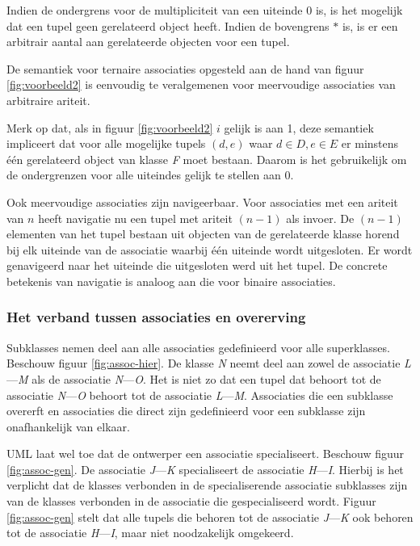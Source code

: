 Indien de ondergrens voor de multipliciteit van een uiteinde $0$ is, is het mogelijk dat een tupel geen gerelateerd object heeft. Indien de bovengrens $*$ is, is er een arbitrair aantal aan gerelateerde objecten voor een tupel.

De semantiek voor ternaire associaties opgesteld aan de hand van figuur \ref{fig:voorbeeld2} is eenvoudig te veralgemenen voor meervoudige associaties van arbitraire ariteit.

Merk op dat, als in figuur \ref{fig:voorbeeld2} $i$ gelijk is aan 1, deze semantiek impliceert dat voor alle mogelijke tupels $(d,e)$ waar $d \in D, e \in E$ er minstens \'e\'en gerelateerd object van klasse \textit{F} moet bestaan. Daarom is het gebruikelijk om de ondergrenzen voor alle uiteindes gelijk te stellen aan 0.

Ook meervoudige associaties zijn navigeerbaar. Voor associaties met een ariteit van $n$ heeft navigatie nu een tupel met ariteit $(n-1)$ als invoer. De $(n-1)$ elementen van het tupel bestaan uit objecten van de gerelateerde klasse horend bij elk uiteinde van de associatie waarbij \'e\'en uiteinde wordt uitgesloten. Er wordt genavigeerd naar het uiteinde die uitgesloten werd uit het tupel. De concrete betekenis van navigatie is analoog aan die voor binaire associaties.

\subsubsection{Het verband tussen associaties en overerving}

Subklasses nemen deel aan alle associaties gedefinieerd voor alle superklasses. Beschouw figuur \ref{fig:assoc-hier}. De klasse \textit{N} neemt deel aan zowel de associatie \textit{L}---\textit{M} als de associatie \textit{N}---\textit{O}. Het is niet zo dat een tupel dat behoort tot de associatie \textit{N}---\textit{O} behoort tot de associatie \textit{L}---\textit{M}. Associaties die een subklasse overerft en associaties die direct zijn gedefinieerd voor een subklasse zijn onafhankelijk van elkaar.

UML laat wel toe dat de ontwerper een associatie specialiseert\cite{RumbaughJames2005Tuml}. Beschouw figuur \ref{fig:assoc-gen}. De associatie \textit{J}---\textit{K} specialiseert de associatie \textit{H}---\textit{I}. Hierbij is het verplicht dat de klasses verbonden in de specialiserende associatie subklasses zijn van de klasses verbonden in de associatie die gespecialiseerd wordt. Figuur \ref{fig:assoc-gen} stelt dat alle tupels die behoren tot de associatie \textit{J}---\textit{K} ook behoren tot de associatie \textit{H}---\textit{I}, maar niet noodzakelijk omgekeerd.

